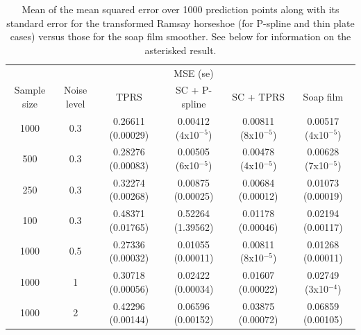 \begin{table}[ht]
\begin{tabular}{c c c c c c}\\
& & & MSE (se) &\\
Sample size & Noise level & TPRS & SC + P-spline& SC + TPRS & Soap film\\
\hline
\hline
1000 & 0.3 & 0.26611 (0.00029) & 0.00412 (4x10$^{-5}$) & 0.00811 (8x10$^{-5}$) & 0.00517 (4x10$^{-5}$) \\ 
500 & 0.3 & 0.28276 (0.00083) & 0.00505 (6x10$^{-5}$) & 0.00478 (4x10$^{-5}$) & 0.00628 (7x10$^{-5}$) \\ 
250 & 0.3 & 0.32274 (0.00268) & 0.00875 (0.00025) & 0.00684 (0.00012) & 0.01073 (0.00019) \\ 
100 & 0.3 & 0.48371 (0.01765) & 0.52264 (1.39562) & 0.01178 (0.00046) & 0.02194 (0.00117) \\ 
1000 & 0.5 & 0.27336 (0.00032) & 0.01055 (0.00011) & 0.00811 (8x10$^{-5}$) & 0.01268 (0.00011) \\ 
1000 & 1 & 0.30718 (0.00056) & 0.02422 (0.00034) & 0.01607 (0.00022) & 0.02749 (3x10$^{-4}$) \\ 
1000 & 2 & 0.42296 (0.00144) & 0.06596 (0.00152) & 0.03875 (0.00072) & 0.06859 (0.00105) \\ 
\end{tabular}
\label{scramsayres}
\caption{Mean of the mean squared error over 1000 prediction points along with its standard error for the transformed Ramsay horseshoe (for P-spline and thin plate cases) versus those for the soap film smoother. See below for information on the asterisked result.}
\end{table}

